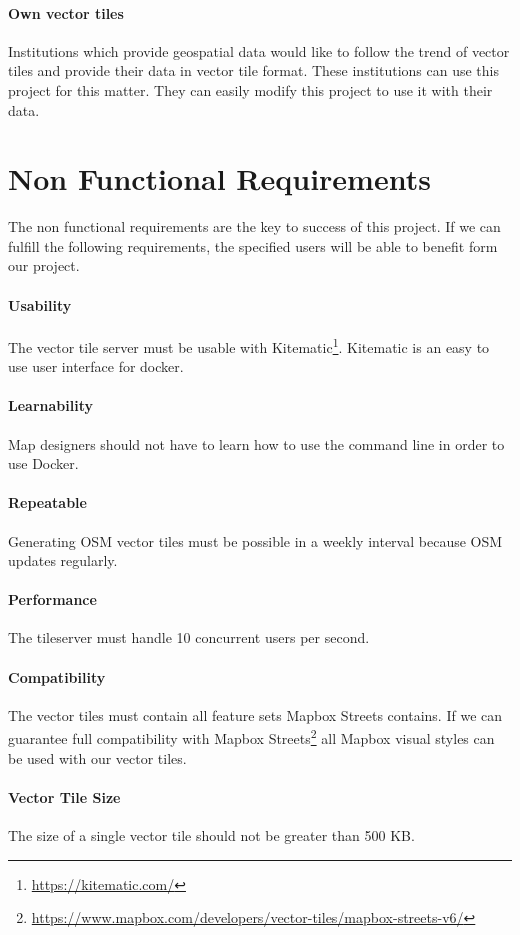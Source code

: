 \paragraph{Own vector tiles}
Institutions which provide geospatial data would like to follow the trend of vector tiles and provide their data in vector tile format. These institutions can use this project for this matter. They can easily modify this project to use it with their data. 

\section{Non Functional Requirements}\label{non_functional_requirements}

The non functional requirements are the key to success of this project. If we can fulfill the following requirements, the specified users will be able to benefit form our project.

\paragraph{Usability}
The vector tile server must be usable with Kitematic\footnote{\url{https://kitematic.com/}}. Kitematic is an easy to use user interface for docker. 

\paragraph{Learnability}

Map designers should not have to learn how to use the command line in
order to use Docker.

\paragraph{Repeatable}

Generating OSM vector tiles must be possible in a weekly interval because OSM
updates regularly.

\paragraph{Performance}

The tileserver must handle 10 concurrent users per second.

\paragraph{Compatibility}

The vector tiles must contain all feature sets Mapbox Streets contains. If we can guarantee full compatibility with Mapbox Streets\footnote{\url{https://www.mapbox.com/developers/vector-tiles/mapbox-streets-v6/}} all Mapbox visual styles can be used with our vector tiles.

\paragraph{Vector Tile Size}

The size of a single vector tile should not be greater than 500 KB.
